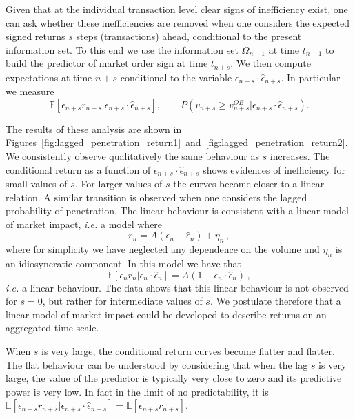 \documentclass[12pt]{iopart}
\begin{document}
Given that at the individual transaction level clear signs of inefficiency exist, one can ask whether these inefficiencies are removed when one considers the expected signed returns $s$ steps (transactions) ahead, conditional to the present information set. To this end we use the  information set $\Omega_{n-1}$ at time $t_{n-1}$ to build the predictor of market order sign at time $t_{n+s}$. We then compute expectations at time $n+s$ conditional to the variable $\epsilon_{n+s}\cdot\hat{\epsilon}_{n+s}$. In particular we measure
\begin{equation*}
\mathbb{E}[\epsilon_{n+s}r_{n+s}|\epsilon_{n+s}\cdot\hat{\epsilon}_{n+s}], \qquad P(v_{n+s} \geqslant v_{n+s}^{OB}|\epsilon_{n+s}\cdot\hat{\epsilon}_{n+s}).
\end{equation*}

The results of these analysis are shown in Figures~\ref{fig:lagged_penetration_return1}~and~\ref{fig:lagged_penetration_return2}. We consistently observe qualitatively the same behaviour as $s$ increases. The conditional return as a function of $\epsilon_{n+s}\cdot\hat{\epsilon}_{n+s}$ shows evidences of inefficiency for small values of $s$. For larger values of $s$ the curves become closer to a linear relation. A similar transition is observed when one considers the lagged probability of penetration. The linear behaviour is consistent with a linear model of market impact, \emph{i.e.} a model where
\begin{equation*}
r_n=A (\epsilon_n-\hat{\epsilon}_n)+\eta_n\,,
\end{equation*}
where for simplicity we have neglected any dependence on the volume and $\eta_n$ is an idiosyncratic component. In this model we have that
\begin{equation*}
\mathbb{E}[\epsilon_n r_n|\epsilon_n\cdot\hat{\epsilon}_n]=A (1-\epsilon_n\cdot\hat{\epsilon}_n)\,,
\end{equation*}
\emph{i.e.} a linear behaviour. The data shows that this linear behaviour is not observed for $s=0$, but rather for intermediate values of $s$. We postulate therefore that a linear model of market impact could be developed to describe returns on an aggregated time scale.

When $s$ is very large, the conditional return curves become flatter and flatter. The flat behaviour can be understood by considering that when the lag $s$ is very large, the value of the predictor is typically very close to zero and its predictive power is very low. In fact in the limit of no predictability, it is $\mathbb{E}[\epsilon_{n+s}r_{n+s}|\epsilon_{n+s}\cdot\hat{\epsilon}_{n+s}]=\mathbb{E}[\epsilon_{n+s}r_{n+s}]$.
\end{document}
